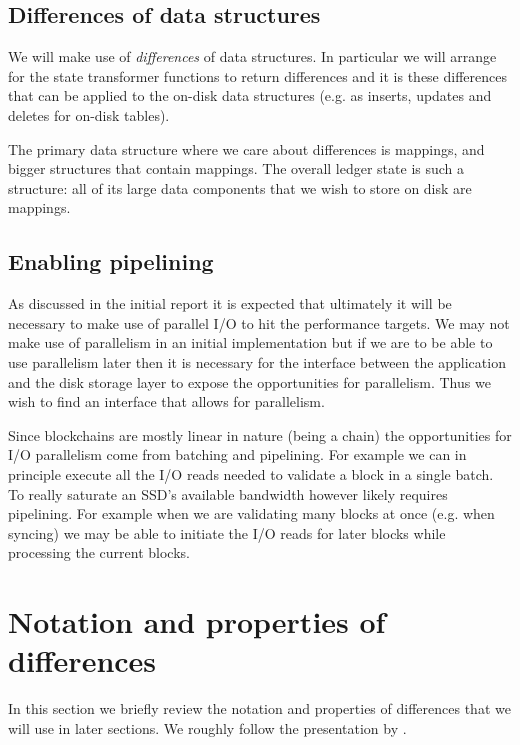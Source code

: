 \documentclass[11pt,a4paper]{article}
\begin{document}
\subsection{Differences of data structures}

We will make use of \emph{differences} of data structures. In particular
we will arrange for the state transformer functions to return differences
and it is these differences that can be applied to the on-disk data
structures (e.g. as inserts, updates and deletes for on-disk tables).

The primary data structure where we care about differences is mappings,
and bigger structures that contain mappings. The overall ledger state is
such a structure: all of its large data components that we wish to store
on disk are mappings.

\subsection{Enabling pipelining}
\label{enabling-pipelining}

As discussed in the initial report \citep[sections 6.1 and 8.8]{utxo-db} it is
expected that ultimately it will be necessary to make use of parallel I/O to
hit the performance targets. We may not make use of parallelism in an initial
implementation but if we are to be able to use parallelism later then it is
necessary for the interface between the application and the disk storage layer
to expose the opportunities for parallelism. Thus we wish to find an interface
that allows for parallelism.

Since blockchains are mostly linear in nature (being a chain) the opportunities
for I/O parallelism come from batching and pipelining. For example we can in
principle execute all the I/O reads needed to validate a block in a single
batch. To really saturate an SSD's available bandwidth however likely requires
pipelining. For example when we are validating many blocks at once (e.g. when
syncing) we may be able to initiate the I/O reads for later blocks while
processing the current blocks.


\section{Notation and properties of differences}
\label{notation-differences}

In this section we briefly review the notation and properties of differences
that we will use in later sections. We roughly follow the presentation by
\cite{change-calculus}.
\end{document}
